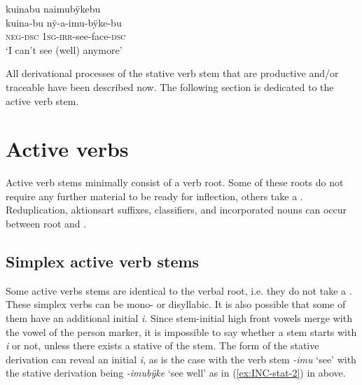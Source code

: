 \ea\label{ex:INC-stat-2}
\begingl
\glpreamble kuinabu naimubÿkebu\\
\gla kuina-bu nÿ-a-imu-bÿke-bu\\
\glb \textsc{neg}-\textsc{dsc} 1\textsc{sg}-\textsc{irr}-see-face-\textsc{dsc}\\
\glft ‘I can’t see (well) anymore’
\endgl
\trailingcitation{[uxx-p110825l.013]}
\xe




All derivational processes of the stative verb stem that are productive and/or traceable have been described now. The following section is dedicated to the active verb stem.

\section{Active verbs}\label{sec:ActiveVerbs}

Active verb stems minimally consist of a verb root. Some of these roots do not require any further material to be ready for inflection, others take a . Reduplication, aktionsart suffixes, classifiers, and incorporated nouns can occur between root and .

\subsection{Simplex active verb stems}\label{sec:SimplexActiveVerbs}

Some active verbs stems are identical to the verbal root, i.e. they do not take a . These simplex verbs can be mono- or disyllabic. It is also possible that some of them have an additional initial  \textit{i}. Since stem-initial high front vowels merge with the vowel of the person marker, it is impossible to say whether a stem starts with \textit{i} or not, unless there exists a stative  of the stem. The  form of the stative derivation can reveal an initial \textit{i}, as is the case with the verb stem \textit{-imu} ‘see’ with the stative derivation being \textit{-imubÿke} ‘see well’ as in (\ref{ex:INC-stat-2}) in  above.

